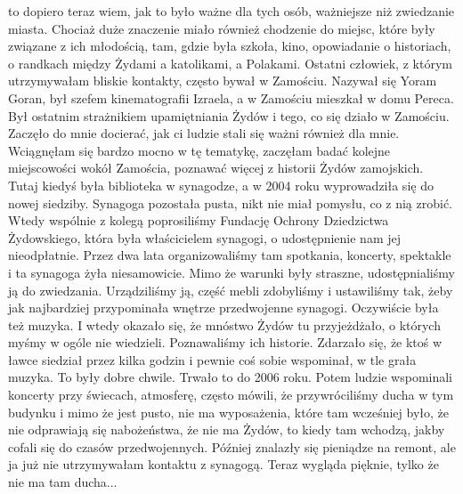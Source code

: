 to dopiero teraz wiem, jak to było ważne dla tych osób, ważniejsze niż zwiedzanie miasta. Chociaż duże znaczenie miało również chodzenie do miejsc, które były związane z ich młodością, tam, gdzie była szkoła, kino, opowiadanie o historiach, o randkach między Żydami a katolikami, a Polakami. Ostatni człowiek, z którym utrzymywałam bliskie kontakty, często bywał w Zamościu. Nazywał się Yoram Goran, był szefem kinematografii Izraela, a w Zamościu mieszkał w domu Pereca. Był ostatnim strażnikiem upamiętniania Żydów i tego, co się działo w Zamościu. Zaczęło do mnie docierać, jak ci ludzie stali się ważni również dla mnie. Wciągnęłam się bardzo mocno w tę tematykę, zaczęłam badać kolejne miejscowości wokół Zamościa, poznawać więcej z historii Żydów zamojskich. Tutaj kiedyś była biblioteka w synagodze, a w 2004 roku wyprowadziła się do nowej siedziby. Synagoga pozostała pusta, nikt nie miał pomysłu, co z nią zrobić. Wtedy wspólnie z kolegą poprosiliśmy Fundację Ochrony Dziedzictwa Żydowskiego, która była właścicielem synagogi, o udostępnienie nam jej nieodpłatnie. Przez dwa lata organizowaliśmy tam spotkania, koncerty, spektakle i ta synagoga żyła niesamowicie. Mimo że warunki były straszne, udostępnialiśmy ją do zwiedzania. Urządziliśmy ją, część mebli zdobyliśmy i ustawiliśmy tak, żeby jak najbardziej przypominała wnętrze przedwojenne synagogi. Oczywiście była też muzyka. I wtedy okazało się, że mnóstwo Żydów tu przyjeżdżało, o których myśmy w ogóle nie wiedzieli. Poznawaliśmy ich historie. Zdarzało się, że ktoś w ławce siedział przez kilka godzin i pewnie coś sobie wspominał, w tle grała muzyka. To były dobre chwile. Trwało to do 2006 roku. Potem ludzie wspominali koncerty przy świecach, atmosferę, często mówili, że przywróciliśmy ducha w tym budynku i mimo że jest pusto, nie ma wyposażenia, które tam wcześniej było, że nie odprawiają się nabożeństwa, że nie ma Żydów, to kiedy tam wchodzą, jakby cofali się do czasów przedwojennych. Później znalazły się pieniądze na remont, ale ja już nie utrzymywałam kontaktu z synagogą. Teraz wygląda pięknie, tylko że nie ma tam ducha...\\
